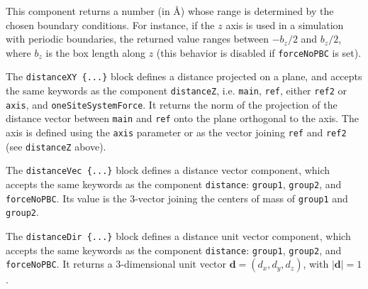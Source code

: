 This component returns a number (in \AA{}) whose range is determined
by the chosen boundary conditions.  For instance, if the $z$ axis is
used in a simulation with periodic boundaries, the returned value ranges
between $-b_{z}/2$ and $b_{z}/2$, where $b_{z}$ is the box length
along $z$ (this behavior is disabled if \texttt{forceNoPBC} is set).


The \texttt{distanceXY~\{...\}} block defines a distance projected on
a plane, and accepts the same keywords as the component \texttt{distanceZ}, i.e.
\texttt{main}, \texttt{ref}, either \texttt{ref2} or \texttt{axis},
and \texttt{oneSiteSystemForce}.  It returns the norm of the
projection of the distance vector between \texttt{main} and
\texttt{ref} onto the plane orthogonal to the axis.  The axis is
defined using the \texttt{axis} parameter or as the vector joining
\texttt{ref} and \texttt{ref2} (see \texttt{distanceZ} above).


The \texttt{distanceVec~\{...\}} block defines
a distance vector component, which accepts the same keywords as
the component \texttt{distance}: \texttt{group1}, \texttt{group2}, and
\texttt{forceNoPBC}. Its value is the 3-vector joining the centers
of mass of \texttt{group1} and \texttt{group2}.


The \texttt{distanceDir~\{...\}} block defines
a distance unit vector component, which accepts the same keywords as
the component \texttt{distance}: \texttt{group1}, \texttt{group2}, and
\texttt{forceNoPBC}.  It returns a
3-dimensional unit vector $\mathbf{d} = (d_{x}, d_{y}, d_{z})$, with
$|\mathbf{d}| = 1$.


